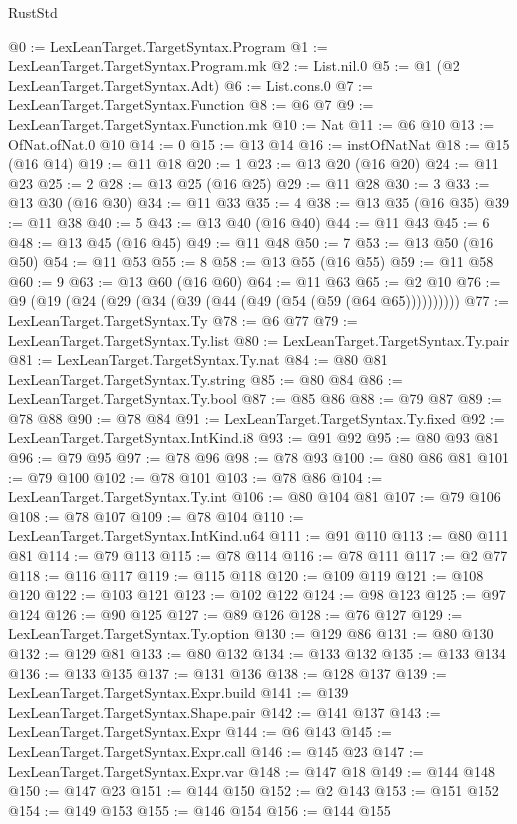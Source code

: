 \begin{lexlean}{RustStd}
\begin{coremodule}
@0 := LexLeanTarget.TargetSyntax.Program
@1 := LexLeanTarget.TargetSyntax.Program.mk
@2 := List.nil.{0}
@5 := @1 (@2 LexLeanTarget.TargetSyntax.Adt)
@6 := List.cons.{0}
@7 := LexLeanTarget.TargetSyntax.Function
@8 := @6 @7
@9 := LexLeanTarget.TargetSyntax.Function.mk
@10 := Nat
@11 := @6 @10
@13 := OfNat.ofNat.{0} @10
@14 := 0
@15 := @13 @14
@16 := instOfNatNat
@18 := @15 (@16 @14)
@19 := @11 @18
@20 := 1
@23 := @13 @20 (@16 @20)
@24 := @11 @23
@25 := 2
@28 := @13 @25 (@16 @25)
@29 := @11 @28
@30 := 3
@33 := @13 @30 (@16 @30)
@34 := @11 @33
@35 := 4
@38 := @13 @35 (@16 @35)
@39 := @11 @38
@40 := 5
@43 := @13 @40 (@16 @40)
@44 := @11 @43
@45 := 6
@48 := @13 @45 (@16 @45)
@49 := @11 @48
@50 := 7
@53 := @13 @50 (@16 @50)
@54 := @11 @53
@55 := 8
@58 := @13 @55 (@16 @55)
@59 := @11 @58
@60 := 9
@63 := @13 @60 (@16 @60)
@64 := @11 @63
@65 := @2 @10
@76 := @9 (@19 (@24 (@29 (@34 (@39 (@44 (@49 (@54 (@59 (@64 @65))))))))))
@77 := LexLeanTarget.TargetSyntax.Ty
@78 := @6 @77
@79 := LexLeanTarget.TargetSyntax.Ty.list
@80 := LexLeanTarget.TargetSyntax.Ty.pair
@81 := LexLeanTarget.TargetSyntax.Ty.nat
@84 := @80 @81 LexLeanTarget.TargetSyntax.Ty.string
@85 := @80 @84
@86 := LexLeanTarget.TargetSyntax.Ty.bool
@87 := @85 @86
@88 := @79 @87
@89 := @78 @88
@90 := @78 @84
@91 := LexLeanTarget.TargetSyntax.Ty.fixed
@92 := LexLeanTarget.TargetSyntax.IntKind.i8
@93 := @91 @92
@95 := @80 @93 @81
@96 := @79 @95
@97 := @78 @96
@98 := @78 @93
@100 := @80 @86 @81
@101 := @79 @100
@102 := @78 @101
@103 := @78 @86
@104 := LexLeanTarget.TargetSyntax.Ty.int
@106 := @80 @104 @81
@107 := @79 @106
@108 := @78 @107
@109 := @78 @104
@110 := LexLeanTarget.TargetSyntax.IntKind.u64
@111 := @91 @110
@113 := @80 @111 @81
@114 := @79 @113
@115 := @78 @114
@116 := @78 @111
@117 := @2 @77
@118 := @116 @117
@119 := @115 @118
@120 := @109 @119
@121 := @108 @120
@122 := @103 @121
@123 := @102 @122
@124 := @98 @123
@125 := @97 @124
@126 := @90 @125
@127 := @89 @126
@128 := @76 @127
@129 := LexLeanTarget.TargetSyntax.Ty.option
@130 := @129 @86
@131 := @80 @130
@132 := @129 @81
@133 := @80 @132
@134 := @133 @132
@135 := @133 @134
@136 := @133 @135
@137 := @131 @136
@138 := @128 @137
@139 := LexLeanTarget.TargetSyntax.Expr.build
@141 := @139 LexLeanTarget.TargetSyntax.Shape.pair
@142 := @141 @137
@143 := LexLeanTarget.TargetSyntax.Expr
@144 := @6 @143
@145 := LexLeanTarget.TargetSyntax.Expr.call
@146 := @145 @23
@147 := LexLeanTarget.TargetSyntax.Expr.var
@148 := @147 @18
@149 := @144 @148
@150 := @147 @23
@151 := @144 @150
@152 := @2 @143
@153 := @151 @152
@154 := @149 @153
@155 := @146 @154
@156 := @144 @155

\end{coremodule}
\end{lexlean}
